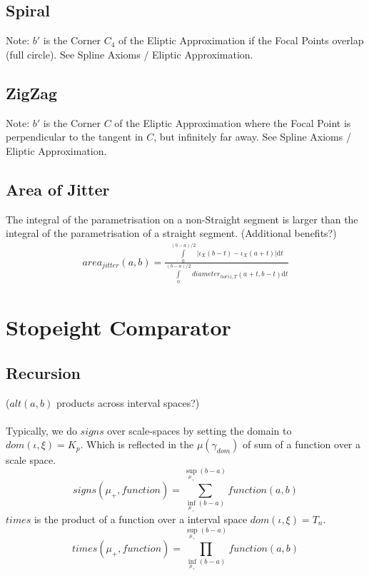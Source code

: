 \documentclass{report}
\begin{document}
\subsection{Spiral}
Note: $b'$ is the Corner $C_{4}$ of the Eliptic Approximation if the Focal Points overlap (full circle). See Spline Axioms / Eliptic Approximation.

\subsection{ZigZag}
Note: $b'$ is the Corner $C$ of the Eliptic Approximation where the Focal Point is perpendicular to the tangent in $C$, but infinitely far away. See Spline Axioms / Eliptic Approximation.

\subsection{Area of Jitter}
The integral of the parametrisation on a non-Straight segment is larger than the integral of the parametrisation of a straight segment. (Additional benefits?)
\begin{align}
area_{jitter}(a,b)=\frac{\int \limits _{0}^{(b-a)/2} \lvert \iota_{X}(b-t)-\iota_{X}(a+t)\rvert \mathrm{d}t}{\int \limits _{0}^{(b-a)/2} diameter_{horiz,T}(a+t,b-t)\mathrm{d}t}
\end{align}

\section{Stopeight Comparator}

\subsection{Recursion}
($alt(a,b)$ products across interval spaces?)\\\\
Typically, we do $signs$ over scale-spaces by setting the domain to $dom(\iota,\xi)=K_{p}$.
Which is reflected in the $\mu(\gamma_{dom})$ of sum of a function over a scale space.\\
\begin{equation}
signs(\mu_{+},function )= \sum \limits _{\inf \limits _{\mu_{+}} (b-a)}^{\sup \limits _{\mu_{+}} (b-a)} function (a,b)
\end{equation}
$times$ is the product of a function over a interval space $dom(\iota,\xi)=T_{n}$.
\begin{equation}
times(\mu_{+},function) = \prod_{\inf \limits _{\mu_{+}} (b-a)}^{\sup \limits _{\mu_{+}} (b-a)} function(a,b)
\end{equation}
\end{document}

